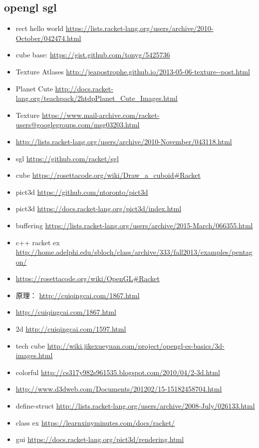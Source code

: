 \documentclass[9pt,b5paper]{article}
\begin{document}
\subsection{opengl sgl}
\label{sec-2-1}
\begin{itemize}
\item rect hello world \url{https://lists.racket-lang.org/users/archive/2010-October/042474.html}
\item cube base: \url{https://gist.github.com/tonyg/5425736}
\item Texture Atlases \url{http://jeapostrophe.github.io/2013-05-06-texture--post.html}
\item Planet Cute \url{http://docs.racket-lang.org/teachpack/2htdpPlanet_Cute_Images.html}
\item Texture \url{https://www.mail-archive.com/racket-users@googlegroups.com/msg03203.html}
\item \url{http://lists.racket-lang.org/users/archive/2010-November/043118.html}
\item sgl \url{https://github.com/racket/sgl}
\item cube \url{https://rosettacode.org/wiki/Draw_a_cuboid#Racket}
\item pict3d \url{https://github.com/ntoronto/pict3d}
\item pict3d \url{https://docs.racket-lang.org/pict3d/index.html}
\item buffering \url{https://lists.racket-lang.org/users/archive/2015-March/066355.html}
\item c++ racket ex \url{http://home.adelphi.edu/sbloch/class/archive/333/fall2013/examples/pentagon/}
\item \url{https://rosettacode.org/wiki/OpenGL#Racket}
\item 原理： \url{http://cuiqingcai.com/1867.html}
\item \url{http://cuiqingcai.com/1867.html}
\item 2d \url{http://cuiqingcai.com/1597.html}
\item tech cube \url{http://wiki.jikexueyuan.com/project/opengl-es-basics/3d-images.html}
\item colorful \url{http://cs317y982s961535.blogspot.com/2010/04/2-3d.html}
\item \url{http://www.d3dweb.com/Documents/201202/15-15182458704.html}
\item define-struct \url{http://lists.racket-lang.org/users/archive/2008-July/026133.html}
\item class ex \url{https://learnxinyminutes.com/docs/racket/}
\item gui \url{https://docs.racket-lang.org/pict3d/rendering.html}
\end{itemize}
\end{document}
